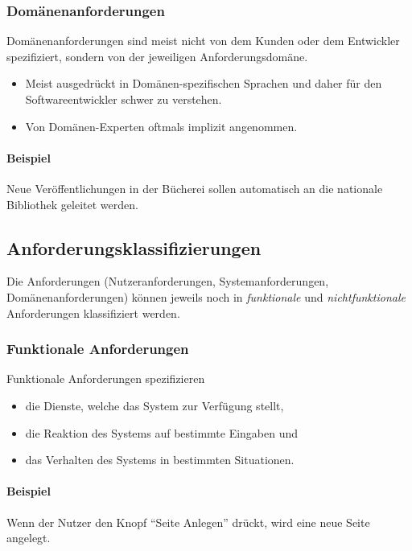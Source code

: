 \documentclass[a4paper, 11pt, accentcolor = tud3b]{tudreport}
\begin{document}
				\subsubsection{Domänenanforderungen}
					Domänenanforderungen sind meist nicht von dem Kunden oder dem Entwickler spezifiziert, sondern von der jeweiligen Anforderungsdomäne.
					
					\begin{itemize}
						\item Meist ausgedrückt in Domänen-spezifischen Sprachen und daher für den Softwareentwickler schwer zu verstehen.
						\item Von Domänen-Experten oftmals implizit angenommen.
					\end{itemize}
					
					\paragraph{Beispiel}
						Neue Veröffentlichungen in der Bücherei sollen automatisch an die nationale Bibliothek geleitet werden.
			
			\subsection{Anforderungsklassifizierungen}
				Die Anforderungen (Nutzeranforderungen, Systemanforderungen, Domänenanforderungen) können jeweils noch in \textit{funktionale} und \textit{nichtfunktionale} Anforderungen klassifiziert werden.
				
				\subsubsection{Funktionale Anforderungen}
					Funktionale Anforderungen spezifizieren
					\begin{itemize}
						\item die Dienste, welche das System zur Verfügung stellt,
						\item die Reaktion des Systems auf bestimmte Eingaben und
						\item das Verhalten des Systems in bestimmten Situationen.
					\end{itemize}
					
					\paragraph{Beispiel}
						Wenn der Nutzer den Knopf \enquote{Seite Anlegen} drückt, wird eine neue Seite angelegt.
				
\end{document}

